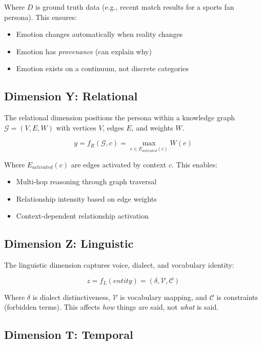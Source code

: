 \documentclass[11pt]{article}
\begin{document}
Where $D$ is ground truth data (e.g., recent match results for a sports fan persona). This ensures:
\begin{itemize}
    \item Emotion changes automatically when reality changes
    \item Emotion has \textit{provenance} (can explain why)
    \item Emotion exists on a continuum, not discrete categories
\end{itemize}

\subsection{Dimension Y: Relational}

The relational dimension positions the persona within a knowledge graph $\mathcal{G} = (V, E, W)$ with vertices $V$, edges $E$, and weights $W$.

\begin{equation}
y = f_R(\mathcal{G}, c) = \max_{e \in E_{activated}(c)} W(e)
\end{equation}

Where $E_{activated}(c)$ are edges activated by context $c$. This enables:
\begin{itemize}
    \item Multi-hop reasoning through graph traversal
    \item Relationship intensity based on edge weights
    \item Context-dependent relationship activation
\end{itemize}

\subsection{Dimension Z: Linguistic}

The linguistic dimension captures voice, dialect, and vocabulary identity:

\begin{equation}
z = f_L(entity) = (\delta, \mathcal{V}, \mathcal{C})
\end{equation}

Where $\delta$ is dialect distinctiveness, $\mathcal{V}$ is vocabulary mapping, and $\mathcal{C}$ is constraints (forbidden terms). This affects \textit{how} things are said, not \textit{what} is said.

\subsection{Dimension T: Temporal}
\end{document}
